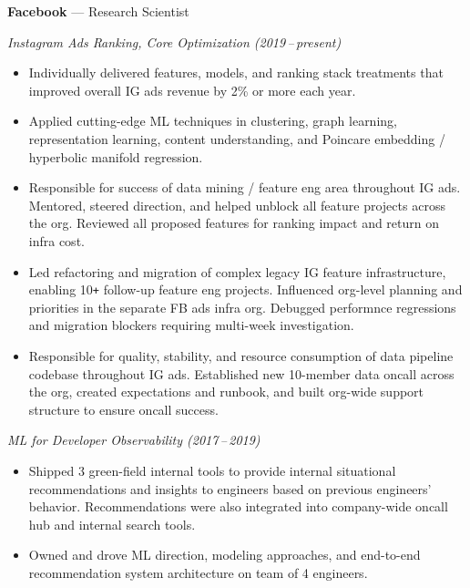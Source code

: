 \documentclass[10pt,letterpaper]{article}
\newcommand{\dates}[1]{\item[#1\hfill]}
\newcommand{\jobhead}[3]{{\dates{#1}{\bf #2} --- {#3}}}
\newcommand{\jobsubhead}[2]{{{\it #2 (#1)}}}
\newenvironment{jobs}
  {\leftmargini=24.1mm%
   \begin{list}%
    {}
    {\setlength\labelwidth{22mm}\itemsep=1.5mm}}
  {\end{list}}
\begin{document}
\begin{jobs}

\jobhead{2017\,--\,present} {Facebook}{Research Scientist}

\jobsubhead{2019\,--\,present}{Instagram Ads Ranking, Core Optimization}

\begin{itemize}
\item Individually delivered features, models, and ranking stack treatments that improved
	overall IG ads revenue by 2\% or more each year.

\item Applied cutting-edge ML techniques in clustering, graph learning, representation learning,
	content understanding, and Poincare embedding / hyperbolic manifold regression.

\item Responsible for success of data mining / feature eng area throughout IG ads. Mentored, steered
	direction, and helped unblock all feature projects across the org.
	Reviewed all proposed features for ranking impact and return on infra cost.

\item Led refactoring and migration of complex legacy IG feature infrastructure,
	enabling 10\verb!+! follow-up feature eng projects.
	Influenced org-level planning and priorities
	in the separate FB ads infra org. Debugged
	performnce regressions and migration blockers requiring multi-week investigation.

\item Responsible for quality, stability, and resource consumption of data
	pipeline codebase throughout IG ads. Established new 10-member data oncall across the
	org, created expectations and runbook, and built org-wide support structure
	to ensure oncall success.

\end{itemize}

\jobsubhead{2017\,--\,2019}{ML for Developer Observability}
\begin{itemize}

\item Shipped 3 green-field internal tools to provide internal situational
	recommendations and insights to engineers based on previous
	engineers' behavior. Recommendations were also integrated into company-wide oncall hub and
	internal search tools.

\item Owned and drove ML direction, modeling approaches, and end-to-end
	recommendation system architecture on team of 4 engineers.


\end{itemize}
\end{jobs}
\end{document}
